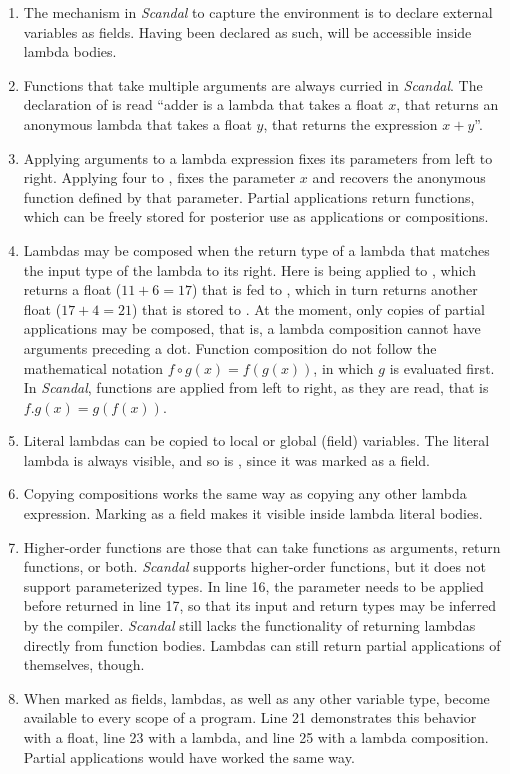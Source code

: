 \begin{enumerate}
	\item The mechanism in \emph{Scandal} to capture the environment is to declare external variables as fields. Having been declared as such,  will be accessible inside lambda bodies.
	\addtocounter{enumi}{1}
	\item Functions that take multiple arguments are always curried in \emph{Scandal}. The declaration of  is read ``adder is a lambda that takes a float $x$, that returns an anonymous lambda that takes a float $y$, that returns the expression $x + y$''.
	\item Applying arguments to a lambda expression fixes its parameters from left to right. Applying four to , fixes the parameter $x$ and recovers the anonymous function defined by that parameter. Partial applications return functions, which can be freely stored for posterior use as applications or compositions.
	\addtocounter{enumi}{1}
	\item Lambdas may be composed when the return type of a lambda that matches the input type of the lambda to its right. Here  is being applied to , which returns a float ($11 + 6 = 17$) that is fed to , which in turn returns another float ($17 + 4 = 21$) that is stored to . At the moment, only copies of partial applications may be composed, that is, a lambda composition cannot have arguments preceding a dot. Function composition do not follow the mathematical notation $f \circ g(x) = f(g(x))$, in which $g$ is evaluated first. In \emph{Scandal}, functions are applied from left to right, as they are read, that is $f.g(x) = g(f(x))$.
	\addtocounter{enumi}{1}
	\item Literal lambdas can be copied to local or global (field) variables. The literal lambda  is always visible, and so is , since it was marked as a field.
	\addtocounter{enumi}{3}
	\item Copying compositions works the same way as copying any other lambda expression. Marking  as a field makes it visible inside lambda literal bodies.
	\addtocounter{enumi}{2}
	\item Higher-order functions are those that can take functions as arguments, return functions, or both. \emph{Scandal} supports higher-order functions, but it does not support parameterized types. In line 16, the parameter  needs to be applied before returned in line 17, so that its input and return types may be inferred by the compiler. \emph{Scandal} still lacks the functionality of returning lambdas directly from function bodies. Lambdas can still return partial applications of themselves, though.
	\addtocounter{enumi}{5}
	\item When marked as fields, lambdas, as well as any other variable type, become available to every scope of a program. Line 21 demonstrates this behavior with a float, line 23 with a lambda, and line 25 with a lambda composition. Partial applications would have worked the same way.
\end{enumerate}

